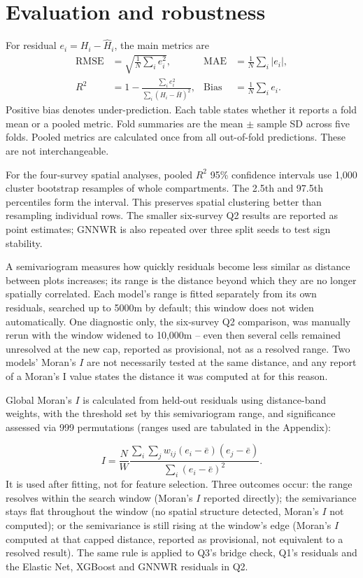 \documentclass[logo,msc,ai]{infthesis}           %
\begin{document}
\section{Evaluation and robustness}
\label{sec:eval-robustness}

For residual $e_i=H_i-\hat H_i$, the main metrics are
\begin{align}
\mathrm{RMSE}&=\sqrt{\frac{1}{N}\sum_i e_i^2}, &
\mathrm{MAE}&=\frac{1}{N}\sum_i|e_i|, \\
R^2&=1-\frac{\sum_i e_i^2}{\sum_i(H_i-\bar H)^2}, &
\mathrm{Bias}&=\frac{1}{N}\sum_i e_i.
\end{align}
Positive bias denotes under-prediction. Each table states whether it reports a fold mean or a
pooled metric. Fold summaries are the mean $\pm$ sample SD across five folds. Pooled metrics are
calculated once from all out-of-fold predictions. These are not interchangeable.

For the four-survey spatial analyses, pooled $R^2$ 95\% confidence intervals use 1,000 cluster bootstrap resamples of whole compartments. The 2.5th and 97.5th percentiles form the interval. This preserves spatial clustering better than resampling individual rows. The smaller six-survey Q2 results are reported as point estimates; GNNWR is also repeated over three split seeds to test sign stability.

A semivariogram measures how quickly residuals become less similar as distance between plots increases; its range is the distance beyond which they are no longer spatially correlated. Each model's range is fitted separately from its own residuals, searched up to 5000m by default; this window does not widen automatically. One diagnostic only, the six-survey Q2 comparison, was manually rerun with the window widened to 10,000m -- even then several cells remained unresolved at the new cap, reported as provisional, not as a resolved range. Two models' Moran's $I$ are not necessarily tested at the same distance, and any report of a Moran's I value states the distance it was computed at for this reason.

Global Moran's $I$ is calculated from held-out residuals using distance-band weights, with the threshold set by this semivariogram range, and significance assessed via 999 permutations (ranges used are tabulated in the Appendix):

\begin{equation}
I=\frac{N}{W}
\frac{\sum_i\sum_j w_{ij}(e_i-\bar e)(e_j-\bar e)}
{\sum_i(e_i-\bar e)^2}.
\label{eq:morans-i}
\end{equation}
It is used after fitting, not for feature selection.
Three outcomes occur: the range resolves within the search window (Moran's $I$ reported directly); the semivariance stays flat throughout the window (no spatial structure detected, Moran's $I$ not computed); or the semivariance is still rising at the window's edge (Moran's $I$ computed at that capped distance, reported as provisional, not equivalent to a resolved result). The same rule is applied to Q3's bridge check, Q1's residuals and the Elastic Net, XGBoost and GNNWR residuals in Q2.
\end{document}
